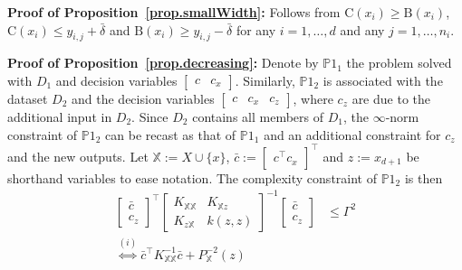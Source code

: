 \begin{my_proof}
	\textbf{Proof of Proposition~\ref{prop.smallWidth}:}
	Follows from $\text{C}(x_i) \geq \text{B}(x_i)$, $\text{C}(x_i) \leq y_{i,j} + \bar \delta$ and $\text{B}(x_i) \geq y_{i,j} - \bar \delta$ for any $i=1,\dots,d$ and any $j=1,\dots,n_i$. 
\end{my_proof} 

\begin{my_proof}
	\textbf{Proof of Proposition~\ref{prop.decreasing}:}
	Denote by $\mathds{P}1_1$ the problem solved with $D_1$ and decision variables $\begin{bmatrix} c & c_x \end{bmatrix}$. Similarly, $\mathds{P}1_2$ is associated with the dataset $D_2$ and the decision variables $\begin{bmatrix} c & c_x & c_z \end{bmatrix}$, where $c_z$ are due to the additional input in $D_2$. Since $D_2$ contains all members of $D_1$, the $\infty$-norm constraint of $\mathds{P}1_2$ can be recast as that of $\mathds{P}1_1$ and an additional constraint for $c_z$ and the new outputs. Let $\mathds{X}  := X \cup \{x\}$, $\bar c := \begin{bmatrix} c^\top c_x \end{bmatrix}^\top$ and $z := x_{d+1}$ be shorthand variables to ease notation. The complexity constraint of $\mathds{P}1_2$ is then
	\begin{subequations}
		\begin{align}
			\begin{bmatrix}
				\bar c \\
				c_z
			\end{bmatrix}^\top 
			\begin{bmatrix}
				K_{\mathds{X} \mathds{X} } & K_{\mathds{X}  z} \\
				K_{z \mathds{X} } & k(z,z)
			\end{bmatrix}^{-1} 
			\begin{bmatrix}
				\bar c \\
				c_z
			\end{bmatrix} & \leq \Gamma^2 \\
			\overset{(i)}{\Leftrightarrow}
			\bar c^\top K_{\mathds{X} \mathds{X} }^{-1} \bar c +
			P_{\mathds{X} }^{-2}(z) \, 

\end{align}
\end{subequations}
\end{my_proof}
